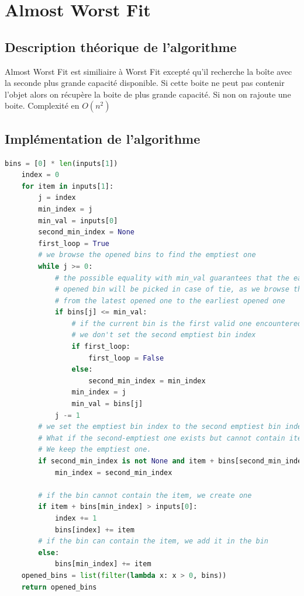 \documentclass{article}
\begin{document}

\section{Almost Worst Fit}

\subsection{Description théorique de l'algorithme}
Almost Worst Fit est similiaire à Worst Fit excepté qu'il recherche la boîte avec la seconde plus grande capacité
disponible.
Si cette boite ne peut pas contenir l'objet alors on récupère la boite de plus grande capacité.
Si non on rajoute une boite.
Complexité en $O(n^2)$

\subsection{Implémentation de l'algorithme}
\begin{lstlisting}[language=Python, frame=single]
    bins = [0] * len(inputs[1])
    index = 0
    for item in inputs[1]:
        j = index
        min_index = j
        min_val = inputs[0]
        second_min_index = None
        first_loop = True
        # we browse the opened bins to find the emptiest one
        while j >= 0:
            # the possible equality with min_val guarantees that the earliest
            # opened bin will be picked in case of tie, as we browse the bins
            # from the latest opened one to the earliest opened one
            if bins[j] <= min_val:
                # if the current bin is the first valid one encountered,
                # we don't set the second emptiest bin index
                if first_loop:
                    first_loop = False
                else:
                    second_min_index = min_index
                min_index = j
                min_val = bins[j]
            j -= 1
        # we set the emptiest bin index to the second emptiest bin index if it exists
        # What if the second-emptiest one exists but cannot contain item ?
        # We keep the emptiest one.
        if second_min_index is not None and item + bins[second_min_index] < inputs[0]:
            min_index = second_min_index

        # if the bin cannot contain the item, we create one
        if item + bins[min_index] > inputs[0]:
            index += 1
            bins[index] += item
        # if the bin can contain the item, we add it in the bin
        else:
            bins[min_index] += item
    opened_bins = list(filter(lambda x: x > 0, bins))
    return opened_bins
\end{lstlisting}
\end{document}

